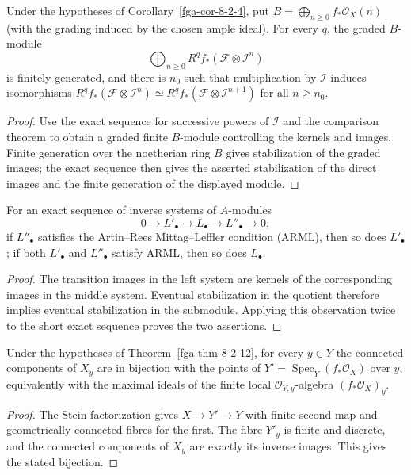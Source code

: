 \begin{corollary}\label{fga-cor-8-2-6-2}
Under the hypotheses of Corollary~\ref{fga-cor-8-2-4}, put
$B=\bigoplus_{n\ge0}f_*\mathcal O_X(n)$ (with the grading induced by the
chosen ample ideal).  For every $q$, the graded $B$-module
\[
\bigoplus_{n\ge0}R^qf_*(\mathcal F\otimes\mathcal I^n)
\]
is finitely generated, and there is $n_0$ such that multiplication by
$\mathcal I$ induces isomorphisms
$R^qf_*(\mathcal F\otimes\mathcal I^n)\simeq
R^qf_*(\mathcal F\otimes\mathcal I^{n+1})$ for all $n\ge n_0$.
\end{corollary}
\begin{proof}
Use the exact sequence for successive powers of $\mathcal I$ and the comparison
theorem to obtain a graded finite $B$-module controlling the kernels and images.
Finite generation over the noetherian ring $B$ gives stabilization of the graded
images; the exact sequence then gives the asserted stabilization of the direct
images and the finite generation of the displayed module.
\end{proof}

\begin{lemma}\label{fga-lem-8-2-7-4}\uses{}
For an exact sequence of inverse systems of $A$-modules
\[
0\to L'_\bullet\to L_\bullet\to L''_\bullet\to0,
\]
if $L''_\bullet$ satisfies the Artin--Rees Mittag--Leffler condition (ARML),
then so does $L'_\bullet$; if both $L'_\bullet$ and $L''_\bullet$ satisfy
ARML, then so does $L_\bullet$.
\end{lemma}
\begin{proof}
The transition images in the left system are kernels of the corresponding images
in the middle system.  Eventual stabilization in the quotient therefore implies
eventual stabilization in the submodule.  Applying this observation twice to the
short exact sequence proves the two assertions.
\end{proof}

\begin{corollary}\label{fga-cor-8-2-13}
Under the hypotheses of Theorem~\ref{fga-thm-8-2-12}, for every $y\in Y$ the
connected components of $X_y$ are in bijection with the points of
$Y'=\operatorname{Spec}_Y(f_*\mathcal O_X)$ over $y$, equivalently with the
maximal ideals of the finite local $\mathcal O_{Y,y}$-algebra
$(f_*\mathcal O_X)_y$.
\end{corollary}
\begin{proof}
The Stein factorization gives $X\to Y'\to Y$ with finite second map and
geometrically connected fibres for the first.  The fibre $Y'_y$ is finite
and discrete, and the connected components of $X_y$ are exactly its inverse
images.  This gives the stated bijection.
\end{proof}

